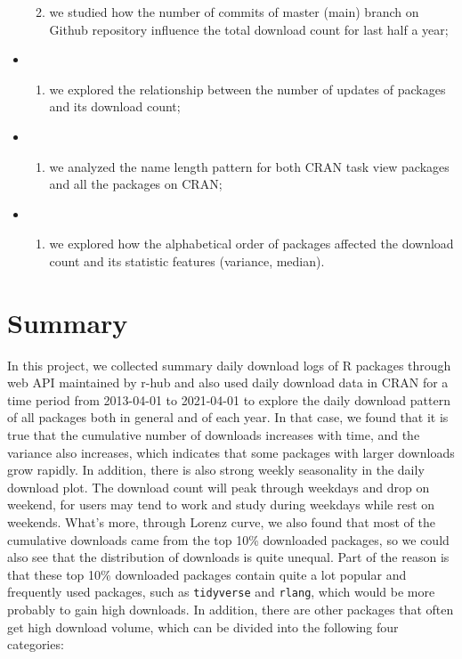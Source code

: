\documentclass[
]{book}
\providecommand{\tightlist}{%
  \setlength{\itemsep}{0pt}\setlength{\parskip}{0pt}}
\begin{document}
\begin{itemize}
  \begin{enumerate}
  \def\labelenumi{\alph{enumi})}
  \setcounter{enumi}{5}
  \tightlist
  \item
    we studied how the number of commits of master (main) branch on Github repository influence the total download count for last half a year;
  \end{enumerate}
\item
  \begin{enumerate}
  \def\labelenumi{\alph{enumi})}
  \setcounter{enumi}{6}
  \tightlist
  \item
    we explored the relationship between the number of updates of packages and its download count;
  \end{enumerate}
\item
  \begin{enumerate}
  \def\labelenumi{\alph{enumi})}
  \setcounter{enumi}{7}
  \tightlist
  \item
    we analyzed the name length pattern for both CRAN task view packages and all the packages on CRAN;
  \end{enumerate}
\item
  \begin{enumerate}
  \def\labelenumi{\roman{enumi})}
  \tightlist
  \item
    we explored how the alphabetical order of packages affected the download count and its statistic features (variance, median).
  \end{enumerate}
\end{itemize}

\hypertarget{summary}{%
\chapter{Summary}\label{summary}}

In this project, we collected summary daily download logs of R packages through web API maintained by r-hub\citep{rhub} and also used daily download data in CRAN for a time period from 2013-04-01 to 2021-04-01 to explore the daily download pattern of all packages both in general and of each year. In that case, we found that it is true that the cumulative number of downloads increases with time, and the variance also increases, which indicates that some packages with larger downloads grow rapidly. In addition, there is also strong weekly seasonality in the daily download plot. The download count will peak through weekdays and drop on weekend, for users may tend to work and study during weekdays while rest on weekends. What's more, through Lorenz curve, we also found that most of the cumulative downloads came from the top 10\% downloaded packages, so we could also see that the distribution of downloads is quite unequal. Part of the reason is that these top 10\% downloaded packages contain quite a lot popular and frequently used packages, such as \texttt{tidyverse} and \texttt{rlang}, which would be more probably to gain high downloads. In addition, there are other packages that often get high download volume, which can be divided into the following four categories:
\end{document}
